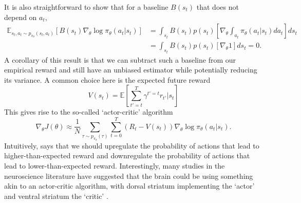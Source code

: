It is also straightforward to show that for a baseline $B(s_t)$ that does not depend on $a_t$,
\begin{align}
    \mathbb{E}_{s_t, a_t \sim p_{\pi_\theta}(s_t, a_t)} \left [ B(s_t) \nabla_\theta \log \pi_\theta (a_t|s_t) \right ]
     & = \int_{s_t} B(s_t) p(s_t) \left [ \nabla_\theta \int_{a_t} \pi_\theta (a_t|s_t) da_t \right ] ds_t \\
     & = \int_{s_t} B(s_t) p(s_t) \left [ \nabla_\theta 1 \right ] ds_t = 0.
\end{align}
A corollary of this result is that we can subtract such a baseline from our empirical reward and still have an unbiased estimator while potentially reducing its variance.
A common choice here is the expected future reward
\begin{equation}
    V(s_t) = \mathbb{E} \left [ \sum_{t' = t}^T \gamma^{t'=t} r_{t'} | s_t \right ]
\end{equation}
This gives rise to the so-called `actor-critic' algorithm
\begin{equation}
    \label{eq:AC}
    \nabla_\theta J(\theta) \approx \frac{1}{N} \sum_{\tau \sim p_{\pi_\theta}(\tau)}  \sum_{t=0}^T (R_t - V(s_t)) \nabla_\theta \log \pi_\theta (a_t|s_t).
\end{equation}
Intuitively,  says that we should upregulate the probability of actions that lead to higher-than-expected reward and downregulate the probability of actions that lead to lower-than-expected reward.
Interestingly, many studies in the neuroscience literature have suggested that the brain could be using something akin to an actor-critic algorithm, with dorsal striatum implementing the `actor' and ventral striatum the `critic' \citep{takahashi2008silencing,sutton2018reinforcement}.

